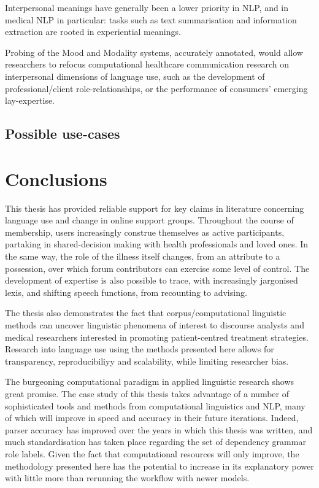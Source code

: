 Interpersonal meanings have generally been a lower priority in \gls{NLP}, and in medical \gls{NLP} in particular: tasks such as text summarisation and information extraction are rooted in experiential meanings.

Probing of the Mood and Modality systems, accurately annotated, would allow researchers to refocus computational healthcare communication research on interpersonal dimensions of language use, such as the development of professional\slash client role-relationships, or the performance of consumers' emerging lay-expertise.

\subsection{Possible use-cases} \lipsum

\section{Conclusions}

This thesis has provided reliable support for key claims in literature concerning language use and change in online support groups. Throughout the course of membership, users increasingly construe themselves as active participants, partaking in shared-decision making with health professionals and loved ones. In the same way, the role of the illness itself changes, from an attribute to a possession, over which forum contributors can exercise some level of control. The development of expertise is also possible to trace, with increasingly jargonised lexis, and shifting speech functions, from recounting to advising.

The thesis also demonstrates the fact that corpus\slash computational linguistic methods can uncover linguistic phenomena of interest to discourse analysts and medical researchers interested in promoting patient-centred treatment strategies. Research into language use using the methods presented here allows for transparency, reproducibiliyy and scalability, while limiting researcher bias.

The burgeoning computational paradigm in applied linguistic research shows great promise. The case study of this thesis takes advantage of a number of sophisticated tools and methods from computational linguistics and \gls{NLP}, many of which will improve in speed and accuracy in their future iterations. Indeed, parser accuracy has improved over the years in which this thesis was written, and much standardisation has taken place regarding the set of dependency grammar role labels. Given the fact that computational resources will only improve, the methodology presented here has the potential to increase in its explanatory power with little more than rerunning the workflow with newer models.

